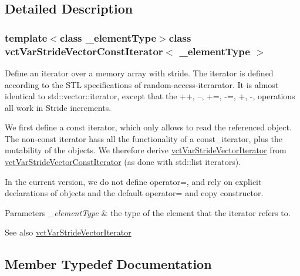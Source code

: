 \subsection{Detailed Description}
\subsubsection*{template$<$class \+\_\+element\+Type$>$class vct\+Var\+Stride\+Vector\+Const\+Iterator$<$ \+\_\+element\+Type $>$}

Define an iterator over a memory array with stride. The iterator is defined according to the S\+T\+L specifications of random-\/access-\/iterarator. It is almost identical to std\+::vector\+::iterator, except that the ++, --, +=, -\/=, +, -\/, operations all work in Stride increments.

We first define a const iterator, which only allows to read the referenced object. The non-\/const iterator hass all the functionality of a const\+\_\+iterator, plus the mutability of the objects. We therefore derive \hyperlink{classvct_var_stride_vector_iterator}{vct\+Var\+Stride\+Vector\+Iterator} from \hyperlink{classvct_var_stride_vector_const_iterator}{vct\+Var\+Stride\+Vector\+Const\+Iterator} (as done with std\+::list iterators).

In the current version, we do not define operator=, and rely on explicit declarations of objects and the default operator= and copy constructor.


\begin{DoxyParams}{Parameters}
{\em \+\_\+element\+Type} & the type of the element that the iterator refers to.\\
\hline
\end{DoxyParams}
\begin{DoxySeeAlso}{See also}
\hyperlink{classvct_var_stride_vector_iterator}{vct\+Var\+Stride\+Vector\+Iterator} 
\end{DoxySeeAlso}


\subsection{Member Typedef Documentation}
\hypertarget{classvct_var_stride_vector_const_iterator_aff6a833a060e9e88031f459ab4380d1e}{}
